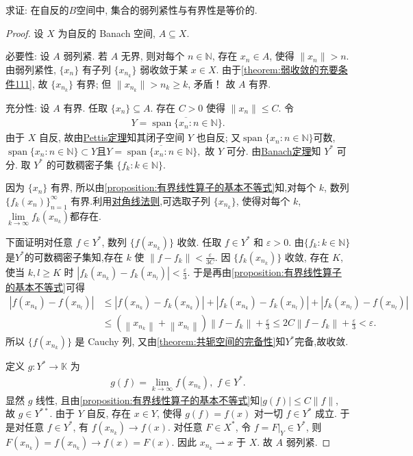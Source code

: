 \documentclass[../../main.tex]{subfiles}%
\begin{document}
\begin{proposition}
求证: 在自反的$B$空间中, 集合的弱列紧性与有界性是等价的.
\end{proposition}
\begin{proof}

设 $X$ 为自反的 Banach 空间, $A\subseteq X$. 

{\heiti 必要性:} 设 $A$ 弱列紧. 若 $A$ 无界, 则对每个 $n\in\mathbb{N}$, 存在 $x_n\in A$, 使得 $\|x_n\|>n$. 由弱列紧性, $\{x_n\}$ 有子列 $\{x_{n_k}\}$ 弱收敛于某 $x\in X$. 由于\cref{theorem:弱收敛的充要条件111}, 故 $\{x_{n_k}\}$ 有界; 但 $\|x_{n_k}\|>n_k\geqslant k$, 矛盾！ 故 $A$ 有界.

{\heiti 充分性:} 设 $A$ 有界. 任取 $\{x_n\}\subseteq A$. 存在 $C>0$ 使得 $\|x_n\|\leqslant C$. 令
\begin{align*}
Y=\overline{\operatorname{span}\{x_n:n\in\mathbb{N}\}}.
\end{align*}
由于 $X$ 自反, 故由\hyperref[theorem:Pettis定理]{Pettis定理}知其闭子空间 $Y$ 也自反; 又$\operatorname{span}\{x_n:n\in\mathbb{N}\}$可数,$\operatorname{span}\{x_n:n\in\mathbb{N}\}\subset Y$且$Y=\overline{\operatorname{span}\{x_n:n\in\mathbb{N}\}},$ 故 $Y$ 可分. 由\hyperref[theorem:泛函分析------Banach定理]{Banach定理}知 $Y^*$ 可分. 取 $Y^*$ 的可数稠密子集 $\{f_k:k\in\mathbb{N}\}$.

因为 $\{x_n\}$ 有界, 所以由\cref{proposition:有界线性算子的基本不等式}知,对每个 $k$, 数列 $\{f_k(x_n)\}_{n=1}^{\infty}$ 有界.利用\hyperref[proposition:对角线法则]{对角线法则},可选取子列 $\{x_{n_k}\}$, 使得对每个 $k$, $\lim\limits_{k\to\infty} f_k(x_{n_k})$都存在.

下面证明对任意 $f\in Y^*$, 数列 $\{f(x_{n_k})\}$ 收敛. 任取 $f\in Y^*$ 和 $\varepsilon>0$. 由$\{f_k:k\in\mathbb{N}\}$是$Y^*$的可数稠密子集知,存在 $k$ 使 $\|f-f_k\|<\frac{\varepsilon}{3C}$. 因 $\{f_k(x_{n_k})\}$ 收敛, 存在 $K$, 使当 $k,l\geqslant K$ 时 $|f_k(x_{n_k})-f_k(x_{n_l})|<\frac{\varepsilon}{3}$. 于是再由\cref{proposition:有界线性算子的基本不等式}可得
\begin{align*}
|f(x_{n_k})-f(x_{n_l})|
&\leqslant |f(x_{n_k})-f_k(x_{n_k})|+|f_k(x_{n_k})-f_k(x_{n_l})|+|f_k(x_{n_l})-f(x_{n_l})|\\
&\leqslant \left( \left\| x_{n_k} \right\| +\left\| x_{n_l} \right\| \right) \left\| f-f_k \right\| +\frac{\varepsilon}{3}\leqslant 2C\left\| f-f_k \right\| +\frac{\varepsilon}{3}<\varepsilon .
\end{align*}
所以 $\{f(x_{n_k})\}$ 是 Cauchy 列, 又由\cref{theorem:共轭空间的完备性}知$Y^*$完备,故收敛.

定义 $g: Y^*\to\mathbb{K}$ 为
\begin{align*}
g(f)=\lim\limits_{k\to\infty} f(x_{n_k}),\,\,f\in Y^*.
\end{align*}
显然 $g$ 线性, 且由\cref{proposition:有界线性算子的基本不等式}知$|g(f)|\leqslant C\|f\|$, 故 $g\in Y^{**}$. 由于 $Y$ 自反, 存在 $x\in Y$, 使得 $g(f)=f(x)$ 对一切 $f\in Y^*$ 成立. 于是对任意 $f\in Y^*$, 有 $f(x_{n_k})\to f(x)$. 对任意 $F\in X^*$, 令 $f=F|_Y\in Y^*$, 则 $F(x_{n_k})=f(x_{n_k})\to f(x)=F(x)$. 因此 $x_{n_k}\rightharpoonup x$ 于 $X$. 故 $A$ 弱列紧.
\end{proof}
\end{document}
